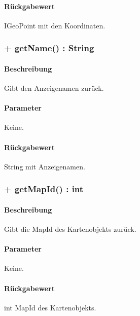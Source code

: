 \paragraph*{Rückgabewert}
IGeoPoint mit den Koordinaten.

\subsubsection{+ getName() : String}%
\paragraph*{Beschreibung}
Gibt den Anzeigenamen zurück.
\paragraph*{Parameter}
Keine.
\paragraph*{Rückgabewert}
String mit Anzeigenamen.

\subsubsection{+ getMapId() : int}%
\paragraph*{Beschreibung}
Gibt die MapId des Kartenobjekts zurück.
\paragraph*{Parameter}
Keine.
\paragraph*{Rückgabewert}
int MapId des Kartenobjekts.
